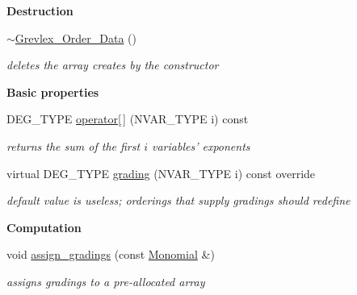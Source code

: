 \begin{Indent}\textbf{ Destruction}\par
\begin{DoxyCompactItemize}
\item 
\mbox{\label{group__orderinggroup_a275afe22c3514d5602eda962402821c3}} 
\hyperlink{group__orderinggroup_a275afe22c3514d5602eda962402821c3}{$\sim$\+Grevlex\+\_\+\+Order\+\_\+\+Data} ()
\begin{DoxyCompactList}\small\item\em deletes the array creates by the constructor \end{DoxyCompactList}\end{DoxyCompactItemize}
\end{Indent}
\begin{Indent}\textbf{ Basic properties}\par
\begin{DoxyCompactItemize}
\item 
\mbox{\label{group__orderinggroup_aa493ca0ff50ec991894bb95de918e12b}} 
D\+E\+G\+\_\+\+T\+Y\+PE \hyperlink{group__orderinggroup_aa493ca0ff50ec991894bb95de918e12b}{operator\mbox{[}$\,$\mbox{]}} (N\+V\+A\+R\+\_\+\+T\+Y\+PE i) const
\begin{DoxyCompactList}\small\item\em returns the sum of the first $i$ variables' exponents \end{DoxyCompactList}\item 
\mbox{\label{group__orderinggroup_a93ade17bec5b9628d3ed02a776835ee0}} 
virtual D\+E\+G\+\_\+\+T\+Y\+PE \hyperlink{group__orderinggroup_a93ade17bec5b9628d3ed02a776835ee0}{grading} (N\+V\+A\+R\+\_\+\+T\+Y\+PE i) const override
\begin{DoxyCompactList}\small\item\em default value is useless; orderings that supply gradings should redefine \end{DoxyCompactList}\end{DoxyCompactItemize}
\end{Indent}
\begin{Indent}\textbf{ Computation}\par
\begin{DoxyCompactItemize}
\item 
void \hyperlink{group__orderinggroup_aeaf81375ec0b27a6e9c047b1d63c6d55}{assign\+\_\+gradings} (const \hyperlink{group__polygroup_class_monomial}{Monomial} \&)
\begin{DoxyCompactList}\small\item\em assigns gradings to a pre-\/allocated array \end{DoxyCompactList}\end{DoxyCompactItemize}
\end{Indent}
